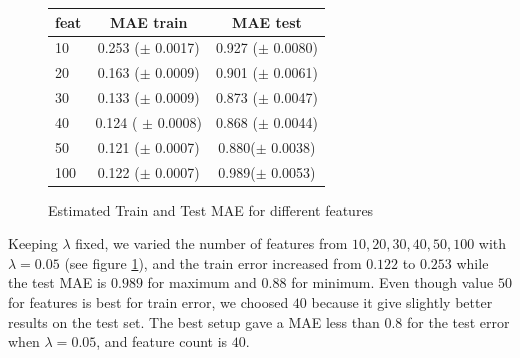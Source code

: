 \begin{figure}[h]
\begin{minipage}{\textwidth}
\begin{minipage}[b]{0.45\textwidth}
  \end{minipage}
  \hfill
  \begin{minipage}[b]{0.5\textwidth}
\begin{center}
  \begin{tabular}{ |l | c | c| }
    \hline
     feat & MAE train & MAE test \\ \hline
     10   & 0.253 ($\pm$  0.0017) &  0.927 ($\pm$ 0.0080) \\ \hline
     20  &  0.163 ($\pm$  0.0009) &  0.901 ($\pm$  0.0061) \\ \hline
     30     & 0.133 ($\pm$ 0.0009)  & 0.873 ($\pm$ 0.0047) \\ \hline
     40    & 0.124  ( $\pm$ 0.0008) & 0.868 ($\pm$  0.0044)\\ \hline
     50       & 0.121 ($\pm$ 0.0007) & 0.880($\pm$  0.0038)\\ \hline
     100    & 0.122 ($\pm$ 0.0007) & 0.989($\pm$  0.0053) \\
    \hline
  \end{tabular}
\end{center}
\vspace{10 mm}
    \end{minipage}
  \end{minipage}
  \caption{Estimated Train and Test MAE for different features}
  \label{fig:ALS_features}
\end{figure}
  
Keeping $\lambda$ fixed, we varied the number of features from $10,20,30,40,50,100$ with $\lambda = 0.05$ (see figure \ref{fig:ALS_features}), and the train error increased from $0.122$ to $0.253$ while the test MAE is $0.989$ for maximum and $0.88$ for minimum. Even though value $50$ for features is best for train error, we choosed $40$ because it give slightly better results on the test set. The best setup gave a MAE less than $0.8$ for the test error when $\lambda=0.05$, and feature count is $40$.



